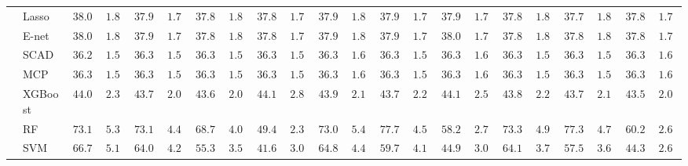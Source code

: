 \begin{tabular}{p{0.2cm}p{1cm}|p{0.6cm}p{0.6cm}|p{0.6cm}p{0.6cm}p{0.6cm}p{0.6cm}p{0.6cm}p{0.6cm}|p{0.6cm}p{0.6cm}p{0.6cm}p{0.6cm}p{0.6cm}p{0.6cm}|p{0.6cm}p{0.6cm}p{0.6cm}p{0.6cm}p{0.6cm}p{0.6cm}}
 & Lasso  & $38.04$ & $1.82$ & $37.90$ & $1.76$ & $37.87$ & $1.81$ & $37.86$ & $1.79$ & $37.90$ & $1.84$ & $37.90$ & $1.78$ & $37.99$ & $1.73$ & $37.85$ & $1.88$ & $37.78$ & $1.82$ & $37.83$ & $1.78$ \\
 & E-net  & $38.04$ & $1.81$ & $37.91$ & $1.76$ & $37.87$ & $1.82$ & $37.88$ & $1.79$ & $37.90$ & $1.83$ & $37.91$ & $1.79$ & $38.01$ & $1.74$ & $37.86$ & $1.89$ & $37.81$ & $1.84$ & $37.84$ & $1.76$ \\
 & SCAD  & $36.29$ & $1.58$ & $36.32$ & $1.59$ & $36.33$ & $1.59$ & $36.33$ & $1.59$ & $36.32$ & $1.61$ & $36.32$ & $1.58$ & $36.32$ & $1.61$ & $36.31$ & $1.59$ & $36.32$ & $1.58$ & $36.33$ & $1.62$ \\
 & MCP  & $36.30$ & $1.58$ & $36.32$ & $1.59$ & $36.32$ & $1.59$ & $36.33$ & $1.59$ & $36.32$ & $1.61$ & $36.32$ & $1.58$ & $36.32$ & $1.61$ & $36.31$ & $1.59$ & $36.32$ & $1.58$ & $36.33$ & $1.62$ \\
 & XGBoost  & $44.01$ & $2.36$ & $43.77$ & $2.01$ & $43.65$ & $2.07$ & $44.17$ & $2.82$ & $43.91$ & $2.19$ & $43.78$ & $2.25$ & $44.12$ & $2.58$ & $43.87$ & $2.29$ & $43.71$ & $2.14$ & $43.52$ & $2.05$ \\
 & RF  & $73.13$ & $5.32$ & $73.15$ & $4.43$ & $68.75$ & $4.08$ & $49.43$ & $2.36$ & $73.01$ & $5.46$ & $77.77$ & $4.55$ & $58.20$ & $2.78$ & $73.33$ & $4.97$ & $77.34$ & $4.71$ & $60.24$ & $2.69$ \\
 & SVM  & $66.76$ & $5.12$ & $64.09$ & $4.27$ & $55.37$ & $3.53$ & $41.67$ & $3.02$ & $64.87$ & $4.45$ & $59.74$ & $4.16$ & $44.95$ & $3.05$ & $64.14$ & $3.79$ & $57.57$ & $3.65$ & $44.34$ & $2.68$ \\
\hline 
\end{tabular}

